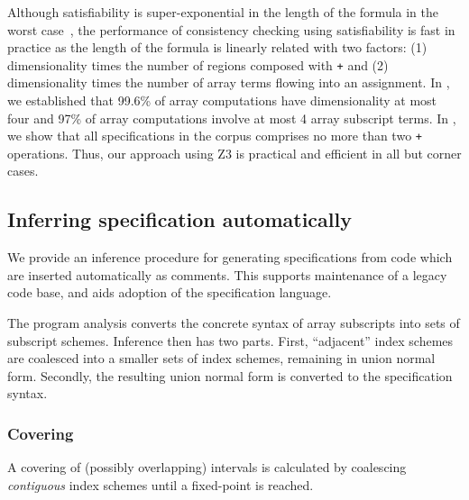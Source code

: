 Although satisfiability is super-exponential in the length of the formula in
the worst case~\cite{fischer1974super}, the performance of consistency checking
using satisfiability is fast in practice as the length of the formula is linearly
related with two factors: (1) dimensionality times the number of regions composed
with \texttt{+} and (2) dimensionality times the number of array terms flowing
into an assignment. In , we
established that 99.6\% of array computations have 
dimensionality at most four and 97\% of array computations
involve at most 4 array subscript terms. In
, we show that all specifications in the corpus
comprises no more than two \texttt{+} operations. Thus, our approach
using Z3 is practical and efficient in all but corner cases.


\subsection{Inferring specification automatically}
\label{subsec:inference}
%
\noindent
We provide an inference procedure for generating specifications from
code which are inserted automatically as comments. This supports
maintenance of a legacy code base, and aids adoption of the
specification language. 

The program analysis converts the concrete syntax of
array subscripts into sets of subscript schemes. Inference then has
two parts. First, ``adjacent'' index schemes are coalesced into a
smaller sets of index schemes, remaining in union normal
form. Secondly, the resulting union normal form is converted to the
specification syntax.

\subsubsection{Covering}
A covering of (possibly overlapping) intervals is calculated
by coalescing \emph{contiguous} index schemes
until a fixed-point is reached.

